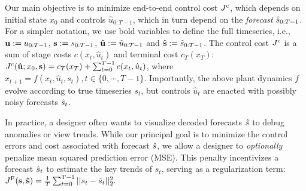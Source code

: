 Our main objective is to minimize end-to-end control cost $J^{\mathrm{c}}$, 
which depends on initial state $x_0$ and controls $\hat{u}_{0:T-1}$, which in turn depend on the \textit{forecast} $\hat{s}_{0:T-1}$. For a simpler notation, we use bold variables to define the full timeseries, i.e., $\bold{u} := u_{0:T-1}$, $\bold{s} := s_{0:T-1}$, $\bold{\hat{u}} := \hat{u}_{0:T-1}$ and $\bold{\hat{s}} := \hat{s}_{0:T-1}$. The control cost $J^{\mathrm{c}}$ is a sum of stage costs $c(x_t, \hat{u}_t)$ and terminal cost $c_T(x_T)$:
$J^{\mathrm{c}}(\bold{\hat{u}}; x_0, \bold{s}) = c_T(x_T) + \sum_{t=0}^{T-1} c(x_t, \hat{u}_t)$, where
$x_{t+1} = f(x_t, \hat{u}_t, s_t), t \in \{0, \cdots, T-1\}$.    
Importantly, the above plant dynamics $f$ evolve according to true timeseries $s_t$, but controls $\hat{u}_t$ are enacted with possibly noisy forecasts $\hat{s}_t$. 

In practice, a designer often wants to visualize decoded forecasts $\hat{s}$ to debug anomalies or view trends. While our principal goal is to minimize the control errors and cost associated with forecast $\hat{s}$, we allow a designer to \textit{optionally} penalize mean squared prediction error (MSE). This penalty incentivizes a forecast $\hat{s}_t$ to estimate the key trends of $s_t$, serving as a regularization term: 
$J^{\mathrm{F}}(\bold{s}, \bold{\hat{s}}) = \frac{1}{T} \sum_{t=0}^{T-1} \vert \vert s_t - \hat{s}_t \vert \vert^2_2.$

